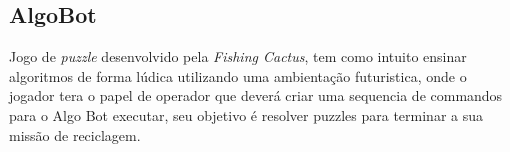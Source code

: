 \subsection{AlgoBot}

Jogo de \textit{puzzle} desenvolvido pela \textit{Fishing Cactus}, tem como intuito ensinar algoritmos de forma lúdica utilizando uma ambientação futuristica, onde o jogador tera o papel de operador que deverá criar uma sequencia de commandos para o Algo Bot executar, seu objetivo é resolver puzzles para terminar a sua missão de reciclagem. \cite{AlgoBotSteam}


